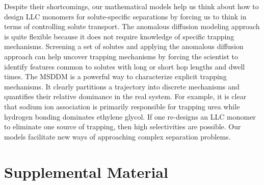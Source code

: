 \documentclass[aps,pre,preprint,groupedaddress,longbibliography]{revtex4-2}
\begin{document}

  Despite their shortcomings, our mathematical models help us think about how 
  to design LLC monomers for solute-specific separations by forcing us to think
  in terms of controlling solute transport. The anomalous diffusion modeling approach is 
  quite flexible because it does not require knowledge of specific trapping 
  mechanisms. Screening a set of solutes and applying the anomalous diffusion 
  approach can help uncover trapping mechanisms by forcing the scientist to 
  identify features common to solutes with long or short hop lengths and dwell
  times. The MSDDM is a powerful way to characterize explicit trapping mechanisms.
  It clearly partitions a trajectory into discrete mechanisms and quantifies their
  relative dominance in the real system. For example, it is clear that 
  sodium ion association is primarily responsible for trapping urea while 
  hydrogen bonding dominates ethylene glycol. If one re-designs an LLC monomer
  to eliminate one source of trapping, then high selectivities are possible.
  Our models facilitate new ways of approaching complex separation problems.
  
  \section*{Supplemental Material}
\end{document}
